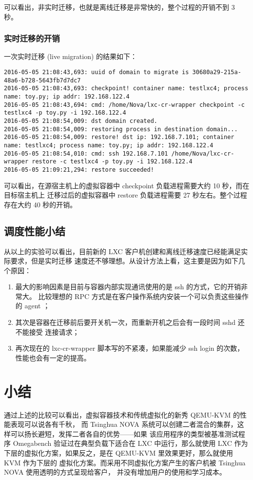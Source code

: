 可以看出，非实时迁移，也就是离线迁移是非常快的，整个过程的开销不到 3 秒。

\subsubsection{实时迁移的开销}

一次实时迁移 (live migration) 的结果如下：

\begin{lstlisting}
2016-05-05 21:08:43,693: uuid of domain to migrate is 30680a29-215a-48a6-b728-5643fb7d7dc7
2016-05-05 21:08:43,693: checkpoint! container name: testlxc4; process name: toy.py; ip addr: 192.168.122.4
2016-05-05 21:08:43,694: cmd: /home/Nova/lxc-cr-wrapper checkpoint -c testlxc4 -p toy.py -i 192.168.122.4
2016-05-05 21:08:54,009: dst domain created.
2016-05-05 21:08:54,009: restoring process in destination domain...
2016-05-05 21:08:54,009: restore! dst ip: 192.168.7.101; container name: testlxc4; process name: toy.py; ip addr: 192.168.122.4
2016-05-05 21:08:54,010: cmd: ssh 192.168.7.101 /home/Nova/lxc-cr-wrapper restore -c testlxc4 -p toy.py -i 192.168.122.4
2016-05-05 21:09:21,294: restore succeeded!
\end{lstlisting}

可以看出，在源宿主机上的虚拟容器中 checkpoint 负载进程需要大约 10 秒，而在目标宿主机上
迁移过后的虚拟容器中 restore 负载进程需要 27 秒左右。整个过程存在大约 40 秒的开销。

\subsection{调度性能小结}

从以上的实验可以看出，目前新的 LXC 客户机创建和离线迁移速度已经能满足实际要求，但是实时迁移
速度还不够理想。从设计方法上看，这主要是因为如下几个原因：

\begin{enumerate}
    \item 最大的影响因素是目前与容器内部实现通讯使用的是 ssh 的方式，它的开销非常大。
    比较理想的 RPC 方式是在客户操作系统内安装一个可以负责这些操作的 agent ；
    \item 其次是容器在迁移前后要开关机一次，而重新开机之后会有一段时间 sshd 还不能接受
    连接请求；
    \item 再次现在的 lxc-cr-wrapper 脚本写的不紧凑，如果能减少 ssh login 的次数，
    性能也会有一定的提高。
\end{enumerate}

\section{小结}

通过上述的比较可以看出，虚拟容器技术和传统虚拟化的新秀 QEMU-KVM 的性能表现可以说各有千秋，
而 Tsinghua NOVA 系统可以创建二者混合的集群，这样可以扬长避短，发挥二者各自的优势——如果
该应用程序的类型被基准测试程序 Omegabench 验证过在典型负载下适合在 LXC 中运行，那么就使用
LXC 作为下层的虚拟化方案，如果反之，是在 QEMU-KVM 里效果更好，那么就使用 KVM 作为下层的
虚拟化方案。而采用不同虚拟化方案产生的客户机被 Tsinghua NOVA 使用透明的方式呈现给客户，
并没有增加用户的使用和学习成本。

